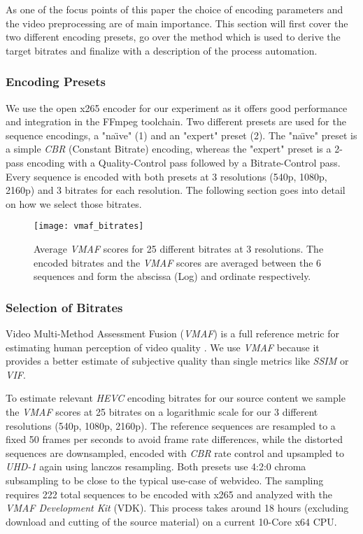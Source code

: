 As one of the focus points of this paper the choice of encoding parameters and the video preprocessing are of main importance. This section will first cover the two different encoding presets, go over the method which is used to derive the target bitrates and finalize with a description of the process automation.

\subsubsection{Encoding Presets}
We use the open x265 encoder for our experiment as it offers good performance and integration in the FFmpeg toolchain. Two different presets are used for the sequence encodings, a "na\"{\i}ve" (1) and an "expert" preset (2). The "na\"{\i}ve" preset is a simple \textit{CBR} (Constant Bitrate) encoding, whereas the "expert" preset is a 2-pass encoding with a Quality-Control pass followed by a Bitrate-Control pass.  Every sequence is encoded with both presets at 3 resolutions (540p, 1080p, 2160p) and 3 bitrates for each resolution. The following section goes into detail on how we select those bitrates.

\begin{figure}[thb!]
	\centering
	\texttt{[image: vmaf\_bitrates]}
	\caption{Average \textit{VMAF} scores for 25 different bitrates at 3 resolutions. The encoded bitrates and the \textit{VMAF} scores are averaged between the 6 sequences and form the abscissa (Log) and ordinate respectively.}
	\label{fig:vmaf:bitrates}
\end{figure}

\subsubsection{Selection of Bitrates}
Video Multi-Method Assessment Fusion (\textit{VMAF}) is a full reference metric for estimating human perception of video quality \cite{lin2013:mmf}. We use \textit{VMAF} because it provides a better estimate of subjective quality than single metrics like \textit{SSIM} or \textit{VIF}.

To estimate relevant \textit{HEVC} encoding bitrates for our source content we sample the \textit{VMAF} scores at 25 bitrates on a logarithmic scale for our 3 different resolutions (540p, 1080p, 2160p). The reference sequences are resampled to a fixed 50 frames per seconds to avoid frame rate differences, while the distorted sequences are downsampled, encoded with \textit{CBR} rate control and upsampled to \textit{UHD-1} again using lanczos resampling. Both presets use 4:2:0 chroma subsampling to be close to the typical use-case of webvideo. The sampling requires 222 total sequences to be encoded with x265 and analyzed with the \textit{VMAF Development Kit} (VDK). This process takes around 18 hours (excluding download and cutting of the source material) on a current 10-Core x64 CPU.

